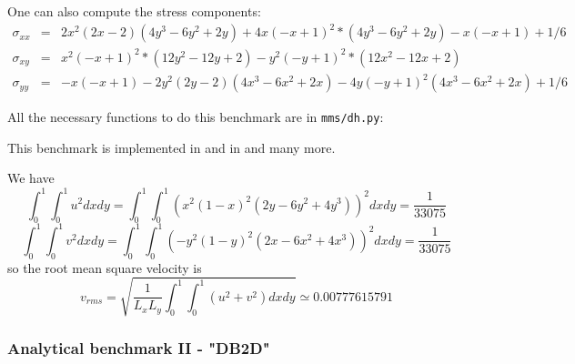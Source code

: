 One can also compute the stress components:
\begin{eqnarray}
\sigma_{xx} &=&  2x^2(2x - 2)(4y^3 - 6y^2 + 2y) + 4x(-x + 1)^2*(4y^3 - 6y^2 + 2y) - x(-x + 1) + 1/6 \\
\sigma_{xy} &=&  x^2(-x + 1)^2*(12y^2 - 12y + 2) - y^2(-y + 1)^2*(12x^2 - 12x + 2) \\
\sigma_{yy} &=&  -x(-x + 1) - 2y^2(2y - 2)(4x^3 - 6x^2 + 2x) - 4y(-y + 1)^2(4x^3 - 6x^2 + 2x) + 1/6
\end{eqnarray}

All the necessary functions to do this benchmark are in {\tt mms/dh.py}:


This benchmark is implemented in \aspect{} \cite{aspectmanual} and in  and many more.

We have
\[
\int_0^1 \int_0^1 u^2 dxdy=
\int_0^1 \int_0^1 ( x^2(1- x)^2 (2y - 6y^2 + 4y^3)  )^2 dx dy = \frac{1}{33075}
\]
\[
\int_0^1 \int_0^1 v^2 dxdy=
\int_0^1 \int_0^1 ( -y^2 (1 - y)^2 (2x - 6x^2 + 4x^3) )^2 dx dy = \frac{1}{33075}
\]
so the root mean square velocity is  
\[
v_{rms} = \sqrt{ \frac{1}{L_x L_y}  \int_0^1 \int_0^1 (u^2+v^2) dx dy } \simeq 0.00777615791
\]



\subsubsection{Analytical benchmark II \label{ss:mms2} - "DB2D"}

